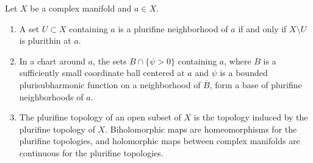\begin{proposition}\label{prop:plurifine-base}
Let $X$ be a complex manifold and $a\in X$.
\begin{enumerate}
\item A set $U\subset X$ containing $a$ is a plurifine neighborhood of $a$ if and only if $X\setminus U$ is plurithin at $a$.
\item In a chart around $a$, the sets $B\cap\{\psi>0\}$ containing $a$, where $B$ is a sufficiently small coordinate ball centered at $a$ and $\psi$ is a bounded plurisubharmonic function on a neighborhood of $\overline B$, form a base of plurifine neighborhoods of $a$.
\item The plurifine topology of an open subset of $X$ is the topology induced by the plurifine topology of $X$. Biholomorphic maps are homeomorphisms for the plurifine topologies, and holomorphic maps between complex manifolds are continuous for the plurifine topologies.
\end{enumerate}
\end{proposition}
